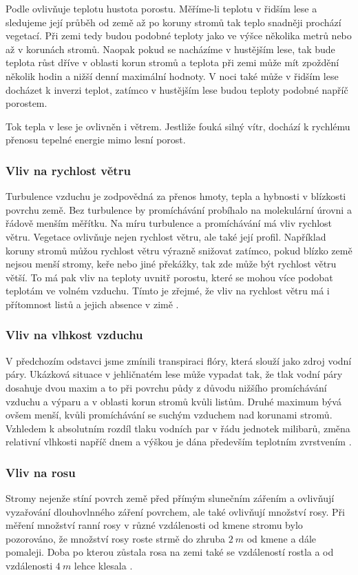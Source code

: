 Podle \cite{alma} ovlivňuje teplotu hustota porostu. Měříme-li teplotu v řidším lese a sledujeme její průběh od země až po koruny stromů tak teplo snadněji prochází vegetací. Při zemi tedy budou podobné teploty jako ve výšce několika metrů nebo až v korunách stromů. Naopak pokud se nacházíme v hustějším lese, tak bude teplota růst dříve v oblasti korun stromů a teplota při zemi může mít zpoždění několik hodin a nižší denní maximální hodnoty. V noci také může v řidším lese docházet k inverzi teplot, zatímco v hustějším lese budou teploty podobné napříč porostem. 

Tok tepla v lese je ovlivněn i větrem. Jestliže fouká silný vítr, dochází k rychlému přenosu tepelné energie mimo lesní porost\cite{alma}. 

\subsubsection{Vliv na rychlost větru}\label{chap:vlivnavitr}
Turbulence vzduchu je zodpovědná za přenos hmoty, tepla a hybnosti v blízkosti povrchu země. Bez turbulence by promíchávání probíhalo na molekulární úrovni a řádově menším měřítku. Na míru turbulence a promíchávání má vliv rychlost větru. Vegetace ovlivňuje nejen rychlost větru, ale také její profil. Například koruny stromů můžou rychlost větru výrazně snižovat zatímco, pokud blízko země nejsou menší stromy, keře nebo jiné překážky, tak zde může být rychlost větru větší. To má pak vliv na teploty uvnitř porostu, které se mohou více podobat teplotám ve volném vzduchu. Tímto je zřejmé, že vliv na rychlost větru má i přítomnost listů a jejich absence v zimě \cite{alma}. 

\subsubsection{Vliv na vlhkost vzduchu}
V předchozím odstavci jsme zmínili transpiraci flóry, která slouží jako zdroj vodní páry. Ukázková situace v jehličnatém lese může vypadat tak, že tlak vodní páry dosahuje dvou maxim a to při povrchu půdy z důvodu nižšího promíchávání vzduchu a výparu a v oblasti korun stromů kvůli listům. Druhé maximum bývá ovšem menší, kvůli promíchávání se suchým vzduchem nad korunami stromů. Vzhledem k absolutním rozdíl tlaku vodních par v řádu jednotek milibarů, změna relativní vlhkosti napříč dnem a výškou je dána především teplotním zvrstvením \cite{alma}. 

\subsubsection{Vliv na rosu}
Stromy nejenže stíní povrch země před přímým slunečním zářením a ovlivňují vyzařování dlouhovlnného záření povrchem, ale také ovlivňují množství rosy. Při měření množství ranní rosy v různé vzdálenosti od kmene stromu bylo pozorováno, že množství rosy roste strmě do zhruba $\SI{2}{m}$ od kmene a dále pomaleji. Doba po kterou zůstala rosa na zemi také se vzdáleností rostla a od vzdálenosti $\SI{4}{m}$ lehce klesala \cite{alma}.

